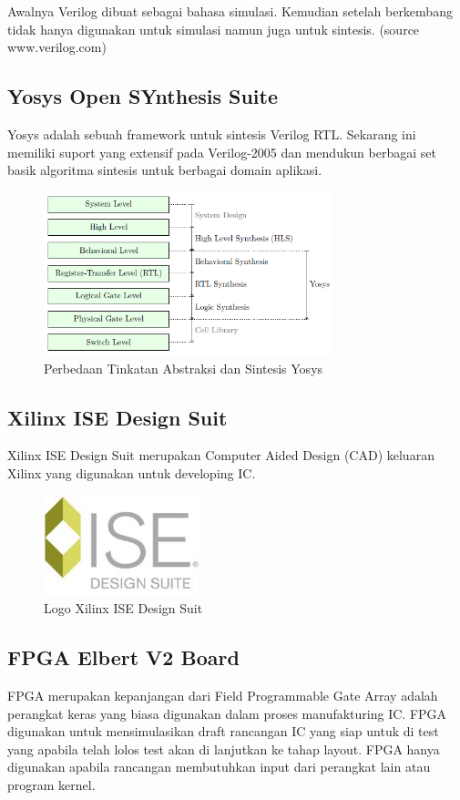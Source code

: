 Awalnya Verilog dibuat sebagai bahasa simulasi. Kemudian setelah berkembang tidak hanya digunakan untuk simulasi namun juga untuk sintesis. (source www.verilog.com)

\subsection{Yosys Open SYnthesis Suite}
Yosys adalah sebuah framework untuk sintesis Verilog RTL. Sekarang ini memiliki suport yang extensif pada Verilog-2005 dan mendukun berbagai set basik algoritma sintesis untuk berbagai domain aplikasi.

\begin{figure}
	\centering
	\includegraphics[width=0.75\textwidth]
	{pics/yosys.png}
	\caption{Perbedaan Tinkatan Abstraksi dan Sintesis Yosys}
	\label{yosys}
\end{figure}

\subsection{Xilinx ISE Design Suit}
Xilinx ISE Design Suit merupakan Computer Aided Design (CAD) keluaran Xilinx yang digunakan untuk developing IC.

\begin{figure}
	\centering
	\includegraphics[width=0.4\textwidth]
	{pics/ise-logo.jpg}
	\caption{Logo Xilinx ISE Design Suit}
	\label{ise}
\end{figure}

\subsection{FPGA Elbert V2 Board}
FPGA merupakan kepanjangan dari Field Programmable Gate Array adalah perangkat keras yang biasa digunakan dalam proses manufakturing IC. FPGA digunakan untuk mensimulasikan draft rancangan IC yang siap untuk di test yang apabila telah lolos test akan di lanjutkan ke tahap layout. FPGA hanya digunakan apabila rancangan membutuhkan input dari perangkat lain atau program kernel.

